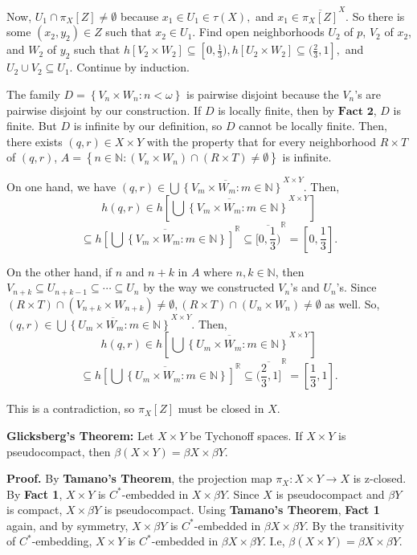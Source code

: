 \documentclass{article}
\begin{document}
\vskip 10pt

Now, $U_1\cap \pi_X[Z]\neq \emptyset$ because $x_1\in U_1\in \tau(X), $ and $x_1\in \overline{\pi_X[Z]}^X.$ So there is some $(x_2,y_2)\in Z$ such that $x_2\in U_1$. Find open neighborhoods $U_2$ of $p$, $V_2$ of $x_2$, and $W_2$ of $y_2$ such that $h\left[V_2\times W_2\right] \subseteq [0,\frac{1}{3}), h\left[U_2\times W_2\right]\subseteq (\frac{2}{3},1],$ and $U_2\cup V_2\subseteq U_1$. Continue by induction. 


\vskip 20pt
The family $D=\left\{V_n\times W_n: n<\omega\right\}$ is pairwise disjoint because the $V_n$'s are pairwise disjoint by our construction. If $D$ is locally finite, then by $\textbf{Fact 2}$, $D$ is finite. But $D$ is infinite by our definition, so $D$ cannot be locally finite. Then, there exists $(q,r)\in X\times Y$ with the property that for every neighborhood $R\times T$ of $(q,r)$, $A=\left\{n\in \mathbb{N}: (V_n\times W_n)\cap (R\times T) \neq \emptyset\right\}$ is infinite. 
\vskip 20pt

On one hand, we have $(q,r)\in \overline{\bigcup\left\{V_m\times W_m: m\in \mathbb{N}\right\}}^{X\times Y}.$ Then, 
$$h(q,r)\in h\left[\overline{\bigcup\left\{V_m\times W_m: m\in \mathbb{N}\right\}}^{X\times Y}\right] $$
$$\subseteq \overline{h\left[\bigcup\left\{V_m\times W_m: m\in \mathbb{N}\right\}\right]}^{\mathbb{R}}\subseteq \overline{[0,\frac{1}{3})}^\mathbb{R}=[0,\frac{1}{3}].$$

\vskip 20pt

On the other hand, if $n$ and $n+k$ in $A$ where $n,k\in \mathbb{N}$, then $V_{n+k}\subseteq U_{n+k-1}\subseteq \cdots \subseteq U_n$ by the way we constructed $V_n$'s and $U_n$'s. Since $(R\times T)\cap (V_{n+k}\times W_{n+k})\neq \emptyset, (R\times T)\cap (U_n\times W_n) \neq \emptyset$ as well. 
\vskip 10pt
So, $(q,r)\in \overline{\bigcup\left\{U_m\times W_m: m\in \mathbb{N}\right\}}^{X\times Y}.$ Then, 
$$h(q,r)\in h\left[\overline{\bigcup\left\{U_m\times W_m: m\in \mathbb{N}\right\}}^{X\times Y}\right] $$
$$\subseteq \overline{h\left[\bigcup\left\{U_m\times W_m: m\in \mathbb{N}\right\}\right]}^{\mathbb{R}}\subseteq \overline{(\frac{2}{3},1]}^\mathbb{R}=[\frac{1}{3}, 1].$$


\vskip 15pt

This is a contradiction, so $\pi_X[Z]$ must be closed in $X$.


\vskip 35pt


\textbf{Glicksberg's Theorem: } Let $X\times Y$ be Tychonoff spaces. If $X\times Y$ is pseudocompact, then $\beta(X\times Y)=\beta X\times \beta Y$. 

\vskip 20pt

\textbf{Proof. } By \textbf{Tamano's Theorem}, the projection map $\pi_X: X\times Y\rightarrow X$ is z-closed. By \textbf{Fact 1}, $X\times Y$ is $C^*$-embedded in $X\times \beta Y$. Since $X$ is pseudocompact and $\beta Y$ is compact, $X\times \beta Y$ is pseudocompact. Using \textbf{Tamano's Theorem}, \textbf{Fact 1} again, and by symmetry, $X\times \beta Y$ is $C^*$-embedded in $\beta X\times \beta Y$. By the transitivity of $C^*$-embedding, $X\times Y$ is $C^*$-embedded in $\beta X\times \beta Y$. I.e, $\beta (X\times Y)=\beta X\times \beta Y$.
\end{document}
